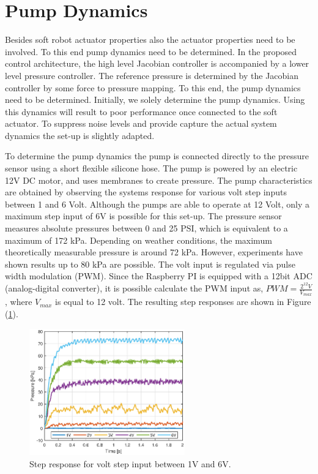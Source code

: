 \newpage
\section{Pump Dynamics}

Besides soft robot actuator properties also the actuator properties need to be involved. To this end pump dynamics need to be determined. In the proposed control architecture, the high level Jacobian controller is accompanied by a lower level pressure controller. The reference pressure is determined by the Jacobian controller by some force to pressure mapping. To this end, the pump dynamics need to be determined. Initially, we solely determine the pump dynamics. Using this dynamics will result to poor performance once connected to the soft actuator. To suppress noise levels and provide capture the actual system dynamics the set-up is slightly adapted.

To determine the pump dynamics the pump is connected directly to the pressure sensor using a short flexible silicone hose. The pump is powered by an electric 12V DC motor, and uses membranes to create pressure. The pump characteristics are obtained by observing the systems response for various volt step inputs between 1 and 6 Volt. Although the pumps are able to operate at 12 Volt, only a maximum step input of 6V is possible for this set-up. The pressure sensor measures absolute pressures between 0 and 25 PSI, which is equivalent to a maximum of 172 kPa. Depending on weather conditions, the maximum theoretically measurable pressure is around 72 kPa. However, experiments have shown results up to 80 kPa are possible. The volt input is regulated via pulse width modulation (PWM). Since the Raspberry PI is equipped with a 12bit ADC (analog-digital converter), it is possible calculate the PWM input as, $\textit{PWM} = \frac{2^{12} V}{V_{max}} $, where $V_{max}$ is equal to 12 volt.  The resulting step responses are shown in Figure (\ref{fig1:pump_dynamcis}).

\begin{figure}[H]
    \centering
    \includegraphics[width = 0.6\textwidth]{Figures/Chapter3/stepresponsdirect16V.eps}
    \caption{Step response for volt step input between 1V and 6V.}
    \label{fig1:pump_dynamcis}
\end{figure}

